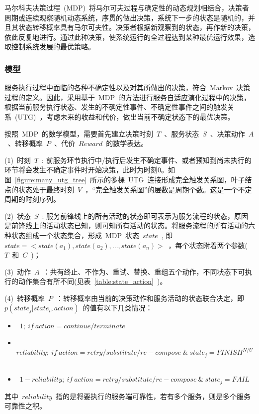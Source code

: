 马尔科夫决策过程~(MDP)~将马尔可夫过程与确定性的动态规划相结合，决策者周期或连续观察随机动态系统，序贯的做出决策，系统下一步的状态是随机的，并且其状态转移概率具有马尔可夫性。决策者根据新观察到的状态，再作新的决策，依此反复地进行。通过此种决策，使系统运行的全过程达到某种最优运行效果，选取控制系统发展的最优策略。

\subsubsection{模型}

服务执行过程中面临的各种不确定性以及对其所做出的决策，符合~Markov~决策过程的定义。因此，采用基于~MDP~的方法进行服务自适应演化过程中的决策，根据当前服务执行状态、发生的不确定性事件、不确定性事件之间的触发关系~(UTG)~，考虑未来的收益和代价，做出当前不确定状态下的最优决策。

按照~MDP~的数学模型，需要首先建立决策时刻~$T$~、服务状态~$S$~、决策动作~$A$~、转移概率~$P$~、代价~$Reward$~的数学表达。

(1)~时刻~$T$~: 前服务环节执行中/执行后发生不确定事件、或者预知到尚未执行的环节将会发生不确定事件时开始决策，此时为时刻0。如图~\ref{figure:many_utg_tree}~所示的多棵~UTG~连接形成完全触发关系图，叶子结点的状态处于最终时刻~$V$~，“完全触发关系图”的层数是周期个数。这是一个不定周期的时刻序列。

(2)~状态~$S$~: 服务前锋线上的所有活动的状态即可表示为服务流程的状态，原因是前锋线上的活动状态已知，则可知所有活动的状态。将服务流程的所有活动的六种状态组成一个状态集合，形成~MDP~状态~$state$~, 即~$state =  < state({a_1}),state({a_2}), \ldots ,state({a_n}) >$~，每个状态附着两个参数(~$T$~和~$C$~)；

(3)~动作~$A$~：共有终止、不作为、重试、替换、重组五个动作，不同状态下可执行的动作集合有所不同(见表~\ref{table:state_action}~)。

(4)~转移概率~$P$~：转移概率由当前的决策动作和服务活动的状态联合决定，即~$p(state_j|state_i,action)$~的值有以下几类情况：
\begin{itemize}
\item ~$1;~if~action = continue/terminate$~
\item ~$reliability;~if~action = retry/substitute/re-compose~ \& ~ state_j = FINIS{H^{N/U}}$~
\item ~$1 - reliability;~if~action = retry/substitute/re-compose ~\& ~ state_j = FAIL$~
\end{itemize}
其中~$reliability$~指的是将要执行的服务端可靠性，若有多个服务，则是多个服务可靠性之积。

